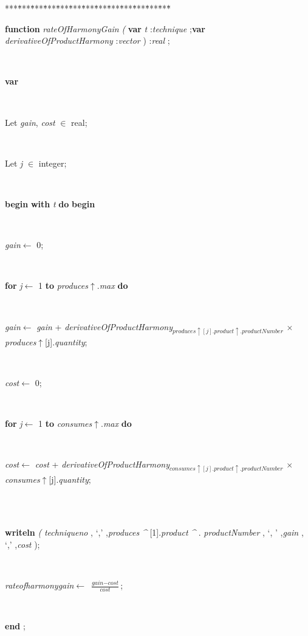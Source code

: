 \begin{tabbing}
***\=***\=***\=***\=***\=***\=***\=***\=***\=***\=***\=***\=***\=\kill
\parbox{14cm}{\textsf{\textbf{function}   \textit{rateOfHarmonyGain} \textit{(} \textbf{var}  \textit{t} :\textit{technique} ;\textbf{var}  \textit{derivativeOfProductHarmony} :\textit{vector} ) :\textit{real} ;}}\\
\+\parbox{14cm}{\textsf{\textbf{var} }}\\
\parbox{14cm}{\textsf{Let \textit{gain}, \textit{cost} $\in$ real;}}\\
\parbox{14cm}{\textsf{Let \textit{j} $\in$ integer;}}\\
\+\<\parbox{14cm}{\textsf{\textbf{begin}     \textbf{with}  \textit{t}  \textbf{do}  \textbf{begin} }}\\
\parbox{14cm}{\textsf{\textit{gain}$\leftarrow$ 0}; }\\
\+\parbox{14cm}{\textsf {\textbf {for } \textsf{\textit{j}$\leftarrow$ 1} \textbf{ to } \textsf{\textit{produces}$\uparrow$.\textit{max}} \textbf{ do } }}\\
\-\parbox{14cm}{\textsf{\textit{gain}$\leftarrow$ \textit{gain} + \textit{derivativeOfProductHarmony}$_{\textit{produces}\uparrow\textit{}[\textit{j}].\textit{product}\uparrow.\textit{productNumber}}$ $\times$ \textit{produces}$\uparrow$\textit{}[j].\textit{quantity}}; }\\
\parbox{14cm}{\textsf{\textit{cost}$\leftarrow$ 0}; }\\
\+\parbox{14cm}{\textsf {\textbf {for } \textsf{\textit{j}$\leftarrow$ 1} \textbf{ to } \textsf{\textit{consumes}$\uparrow$.\textit{max}} \textbf{ do } }}\\
\-\parbox{14cm}{\textsf{\textit{cost}$\leftarrow$ \textit{cost} + \textit{derivativeOfProductHarmony}$_{\textit{consumes}\uparrow\textit{}[\textit{j}].\textit{product}\uparrow.\textit{productNumber}}$ $\times$ \textit{consumes}$\uparrow$\textit{}[j].\textit{quantity}}; }\\
\\
\parbox{14cm}{\textsf{\textbf{writeln} \textit{(} \textit{techniqueno} ,\textrm{\textup { `,' } },\textit{produces} \textit{\^{}} [1].\textit{product} \textit{\^{}} . \textit{productNumber} ,\textrm{\textup { `, ' } },\textit{gain} ,\textrm{\textup { `,' } },\textit{cost} );}}\\
\parbox{14cm}{\textsf{\textit{rateofharmonygain}$\leftarrow$ $\frac{\textit{gain} - \textit{cost}}{\textit{cost}}$}; }\\
\<\-\parbox{14cm}{\textsf{\textbf{end} ;}}\\
\end{tabbing}
